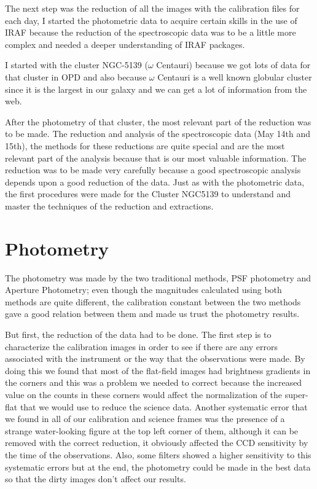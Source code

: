 The next step was the reduction of all the images with the calibration files for each day, I started the photometric data to acquire certain skills in the use of IRAF because the reduction of the spectroscopic data was to be a little more complex and needed a deeper understanding of IRAF packages. 

I started with the cluster NGC-5139 ($ \omega $ Centauri) because we got lots of data for that cluster in OPD and also because $ \omega $ Centauri is a well known globular cluster since it is the largest in our galaxy and we can get a lot of information from the web. 

After the photometry of that cluster, the most relevant part of the reduction was to be made. The reduction and analysis of the spectroscopic data (May 14th and 15th), the methods for these reductions are quite special and are the most relevant part of the analysis because that is our most valuable information. The reduction was to be made very carefully because a good spectroscopic analysis depends upon a good reduction of the data. Just as with the photometric data, the first procedures were made for the Cluster NGC5139 to understand and master the techniques of the reduction and extractions.

\section{Photometry}

The photometry was made by the two traditional methods, PSF photometry and Aperture Photometry; even though the magnitudes calculated using both methods are quite different, the calibration constant between the two methods gave a good relation between them and made us trust the photometry results.

But first, the reduction of the data had to be done. The first step is to characterize the calibration images in order to see if there are any errors associated with the instrument or the way that the observations were made. By doing this we found that most of the flat-field images had brightness gradients in the corners and this was a problem we needed to correct because the increased value on the counts in these corners would affect the normalization of the super-flat that we would use to reduce the science data. Another systematic error that we found in all of our calibration and science frames was the presence of a strange water-looking figure at the top left corner of them, although it can be removed with the correct reduction, it obviously affected the CCD sensitivity by the time of the observations. Also, some filters showed a higher sensitivity to this systematic errors but at the end, the photometry could be made in the best data so that the dirty images don't affect our results.

